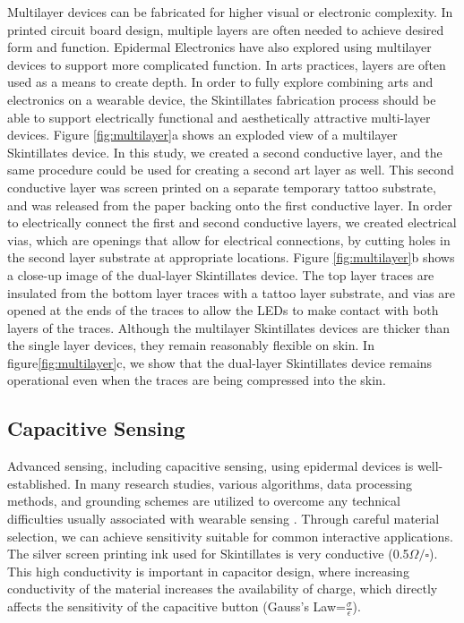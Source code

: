 \documentclass{sigchi}
\begin{document}
Multilayer devices can be fabricated for higher visual or electronic complexity. In printed circuit board design, multiple layers are often needed to achieve desired form and function. Epidermal Electronics have also explored using multilayer devices to support more complicated function\cite{Kim:2014iq}. In arts practices, layers are often used as a means to create depth. In order to fully explore combining arts and electronics on a wearable device, the Skintillates fabrication process should be able to support electrically functional and aesthetically attractive multi-layer devices. Figure \ref{fig:multilayer}a shows an exploded view of a multilayer Skintillates device. In this study, we created a second conductive layer, and the same procedure could be used for creating a second art layer as well. This second conductive layer was screen printed on a separate temporary tattoo substrate, and was released from the paper backing onto the first conductive layer. In order to electrically connect the first and second conductive layers, we created electrical vias, which are openings that allow for electrical connections, by cutting holes in the second layer substrate at appropriate locations. Figure \ref{fig:multilayer}b shows a close-up image of the dual-layer Skintillates device. The top layer traces are insulated from the bottom layer traces with a tattoo layer substrate, and vias are opened at the ends of the traces to allow the LEDs to make contact with both layers of the traces. Although the multilayer Skintillates devices are thicker than the single layer devices, they remain reasonably flexible on skin. In figure\ref{fig:multilayer}c, we show that the dual-layer Skintillates device remains operational even when the traces are being compressed into the skin. 
\subsection{Capacitive Sensing}
Advanced sensing, including capacitive sensing, using epidermal devices is well-established\cite{Jeong:2013km,Frutiger:2015fm,Mannsfeld:2010is}. In many research studies, various algorithms, data processing methods, and grounding schemes are utilized to overcome any technical difficulties usually associated with wearable sensing \cite{Jeong:2013km}.  Through careful material selection, we can achieve sensitivity suitable for common interactive applications. The silver screen printing ink used for Skintillates is very conductive (0.5$\Omega/\square$). 
 This high conductivity is important in capacitor design, where increasing conductivity of the material increases the availability of charge, which directly affects the sensitivity of the capacitive button (Gauss’s Law=$\frac{\sigma}{\epsilon}$).
\end{document}
